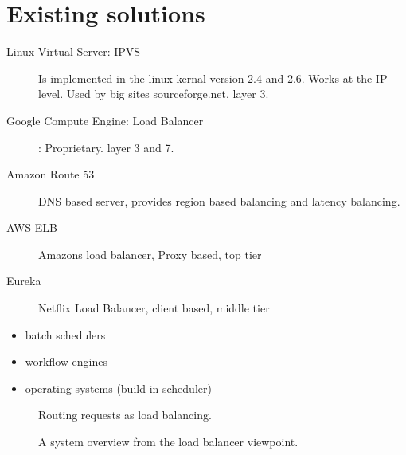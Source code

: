 \section{Existing solutions}
\begin{description}
	\item [Linux Virtual Server: IPVS] Is implemented in the linux kernal version 2.4 and 2.6. Works at the IP level. Used by big sites sourceforge.net, layer 3.
	\item [Google Compute Engine: Load Balancer]: Proprietary. layer 3 and 7.
	\item [Amazon Route 53] DNS based server, provides region based balancing and latency balancing.
	\item [AWS ELB] Amazons load balancer, Proxy based, top tier
	\item [Eureka] Netflix Load Balancer, client based, middle tier
\end{description}

\begin{itemize}
	\item batch schedulers
	\item workflow engines
	\item operating systems (build in scheduler)
\end{itemize}

\begin{figure}
	\centering	
	\scalebox{0.7}{}
	\caption[Routing requests as load balancing]{
		\label{fig:RoutingloadBalancingSetup} 
		\footnotesize{%
			Routing requests as load balancing.
		}
	}
\end{figure}

\begin{figure}
	\centering	
	\scalebox{0.7}{}
	\caption[System overview from the load balancer viewpoint]{
		\label{fig:loadBalancingSetup} 
		\footnotesize{%
			A system overview from the load balancer viewpoint.
		}
	}
\end{figure}















